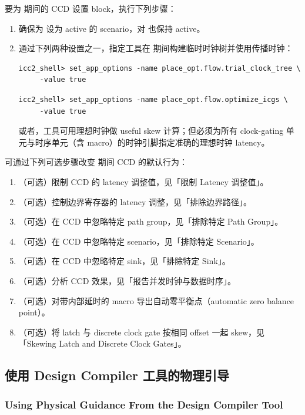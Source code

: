 要为  期间的 CCD 设置 block，执行下列步骤：
\begin{enumerate}
  \item 确保为  设为 active 的 scenario，对  也保持 active。
  \item 通过下列两种设置之一，指定工具在  期间构建临时时钟树并使用传播时钟：
\begin{lstlisting}
icc2_shell> set_app_options -name place_opt.flow.trial_clock_tree \
     -value true
\end{lstlisting}
\begin{lstlisting}
icc2_shell> set_app_options -name place_opt.flow.optimize_icgs \
     -value true
\end{lstlisting}
        或者，工具可用理想时钟做 useful skew 计算；但必须为所有 clock-gating 单元与时序单元（含 macro）的时钟引脚指定准确的理想时钟 latency。
\end{enumerate}

可通过下列可选步骤改变  期间 CCD 的默认行为：
\begin{enumerate}
  \item （可选）限制 CCD 的 latency 调整值，见「限制 Latency 调整值」。
  \item （可选）控制边界寄存器的 latency 调整，见「排除边界路径」。
  \item （可选）在 CCD 中忽略特定 path group，见「排除特定 Path Group」。
  \item （可选）在 CCD 中忽略特定 scenario，见「排除特定 Scenario」。
  \item （可选）在 CCD 中忽略特定 sink，见「排除特定 Sink」。
  \item （可选）分析 CCD 效果，见「报告并发时钟与数据时序」。
  \item （可选）对带内部延时的 macro 导出自动零平衡点（automatic zero balance point）。
  \item （可选）将 latch 与 discrete clock gate 按相同 offset 一起 skew，见「Skewing Latch and Discrete Clock Gates」。
\end{enumerate}

\subsection{使用 Design Compiler 工具的物理引导}
\subsubsection*{Using Physical Guidance From the Design Compiler Tool}

